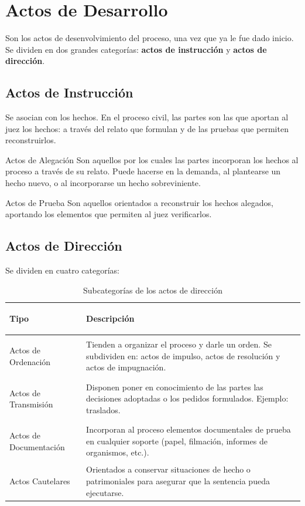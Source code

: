 \documentclass[12pt,oneside]{book}
\begin{document}
\section{Actos de Desarrollo}

Son los actos de desenvolvimiento del proceso, una vez que ya le fue dado inicio. Se dividen en dos grandes categorías: \textbf{actos de instrucción} y \textbf{actos de dirección}.

\subsection{Actos de Instrucción}

Se asocian con los hechos. En el proceso civil, las partes son las que aportan al juez los hechos: a través del relato que formulan y de las pruebas que permiten reconstruirlos.

\begin{definition}{Actos de Alegación}
Son aquellos por los cuales las partes incorporan los hechos al proceso a través de su relato. Puede hacerse en la demanda, al plantearse un hecho nuevo, o al incorporarse un hecho sobreviniente.
\end{definition}

\begin{definition}{Actos de Prueba}
Son aquellos orientados a reconstruir los hechos alegados, aportando los elementos que permiten al juez verificarlos.
\end{definition}

\subsection{Actos de Dirección}

Se dividen en cuatro categorías:

\begin{table}[H]
\centering
\begin{tabularx}{\textwidth}{>{\bfseries\raggedright\arraybackslash}p{} >{\raggedright\arraybackslash}X}
\toprule
\textbf{Tipo} & \textbf{Descripción} \\
\midrule
Actos de Ordenación & Tienden a organizar el proceso y darle un orden. Se subdividen en: actos de impulso, actos de resolución y actos de impugnación. \\[0.4em]
Actos de Transmisión & Disponen poner en conocimiento de las partes las decisiones adoptadas o los pedidos formulados. Ejemplo: traslados. \\[0.4em]
Actos de Documentación & Incorporan al proceso elementos documentales de prueba en cualquier soporte (papel, filmación, informes de organismos, etc.). \\[0.4em]
Actos Cautelares & Orientados a conservar situaciones de hecho o patrimoniales para asegurar que la sentencia pueda ejecutarse. \\
\bottomrule
\end{tabularx}
\caption{Subcategorías de los actos de dirección}
\end{table}
\end{document}
